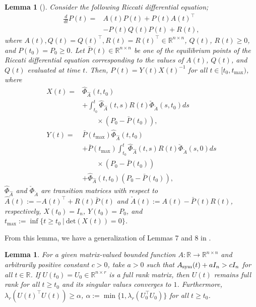 \documentclass[fleqn,10pt]{SICE_FES26}
\newtheorem{lemma}[thm]{Lemma}
\begin{document}
    \begin{lemma}[{\cite[Theorems 13 and 14]{kilicaslan2012existence}}]
    \label{lemma:kilicaslan2012existence}
    Consider the following Riccati differential equation;
	\begin{align*}
	\frac{d}{dt}P(t) =& A(t)P(t) + P(t) A(t)^{\top} 
	\\ & - P(t) Q(t) P(t) + R(t)
	, 
	\end{align*}
	where $A(t), Q(t)=Q(t)^{\top}, R(t) = R(t)^{\top} \in {\mathbb{R}}^{n\times n}$, $Q(t)$, $R(t) \geq 0$, and $P(t_{0})=P_{0} \geq 0$. 
	Let $\bar{P}(t) \in {\mathbb{R}}^{n\times n}$ be one of the equilibrium points of the Riccati differential equation corresponding to the values of $A(t)$, $Q(t)$, and $Q(t)$ evaluated at time $t$.  
	Then, $P(t) = Y(t)X(t)^{-1}$ for all $t \in [t_{0},t_{\max})$, where 
	\begin{align*}
	 X(t) 
	=& \hat{\Phi} _{\hat{A}} (t,t_{0}) 
	\\ & 
	+ \int _{t_{0}}^{t} \hat{\Phi}_{\hat{A}}(t,s) R(t) \check{\Phi}_{\check{A}} (s,t_{0}) ds 
	\\ & \quad \quad \times 
	(P_{0} - \bar{P}(t_{0}))  
	,\\
	 Y(t) 
	 =& \bar{P}(t_{\max}) \hat{\Phi}_{\hat{A}} (t,t_{0})  \\ &
	+ 
	\bar{P}(t_{\max}) \int _{t_{0}}^{t} \hat{\Phi}_{\hat{A}}(t,s) R(t) \check{\Phi}_{\check{A}} (s,0) ds 
	\\ & \quad \quad \times (P_{0} - \bar{P}(t_{0}))  
	\\ &  
	+ \hat{\Phi}_{\hat{A}}(t,t_{0})( P_{0} - \bar{P}(t_{0})  )
	,
	\end{align*} 
	$\hat{\Phi}_{\hat{A}}$ and $\check{\Phi}_{\check{A}}$ are transition matrices with respect to $\hat{A}(t) := -A(t)^{\top} + R(t) \bar{P}(t) $ and $\check{A}(t) := A(t) - \bar{P}(t)R(t) $, respectively, 
	$X(t_{0})=I_{n}$, $Y(t_{0}) = P_{0}$, 
	and $t_{\max} := \inf \{ t \geq t_{0} \ | \ {\mathrm{det}} (X(t)) =0 \}$. 
    \end{lemma}

    
    From this lemma, we have a generalization of Lemmas 7 and 8 in \cite{TsuzukiOhki2025global}. 


    

    \begin{lemma} \label{lem:well_definedness_time_varying_Oja_flow}
    For a given matrix-valued bounded function $A: {\mathbb{R}} \to {\mathbb{R}}^{n\times n}$ and arbitrarily positive constant $c>0$, take $a>0$ such that $A_{\rm sym}(t) + aI_{n} >cI_{n}$ for all $t\in \mathbb{R}$. 
    If $U(t_{0}) = U_{0} \in {\mathbb{R}}^{n\times r}$ is a full rank matrix, then $U(t)$ remains full rank for all $t\geq t_{0}$ and its singular values converges to $1$. 
    Furthermore, $\lambda _{r}( U(t)^{\top} U(t)) \geq \alpha$, $\alpha := \min \{ 1 , \lambda _{r} (U_{0}^{\top}U_{0}) \}$ for all $t\geq t_{0}$. 
    \end{lemma}
    
\end{document}
